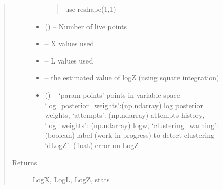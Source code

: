 \documentclass[letterpaper,10pt,english]{sphinxmanual}
\begin{document}
\begin{description}
\begin{fulllineitems}
\begin{quote}
\begin{description}
\begin{itemize}
\begin{quote}
use reshape(\sphinxhyphen{}1,1)
\end{quote}


\item {} 
 () – Number of live points

\item {} 
 – X values used

\item {} 
 – L values used

\item {} 
 – the estimated value of logZ (using square integration)

\item {} 
 (\sphinxstyleliteralemphasis{\sphinxupquote{(}}\sphinxstyleliteralemphasis{\sphinxupquote{,}}\sphinxstyleliteralemphasis{\sphinxupquote{,}}\sphinxstyleliteralemphasis{\sphinxupquote{, }}\sphinxstyleliteralemphasis{\sphinxupquote{, }}\sphinxstyleliteralemphasis{\sphinxupquote{, }}\sphinxstyleliteralemphasis{\sphinxupquote{)}}) – ‘param points’ points in variable space
‘log\_posterior\_weights’:(np.ndarray)    log posterior weights,
‘attempts’:             (np.ndarray)    attempts history,
‘log\_weights’:          (np.ndarray)    logw,
‘clustering\_warning’:   (boolean)       label (work in progress) to detect clustering
‘dLogZ’:                (float)         error on LogZ

\end{itemize}

\item[{Returns}] \leavevmode
LogX, LogL, LogZ, stats

\end{description}\end{quote}

\end{fulllineitems}



\end{description}
\end{document}
